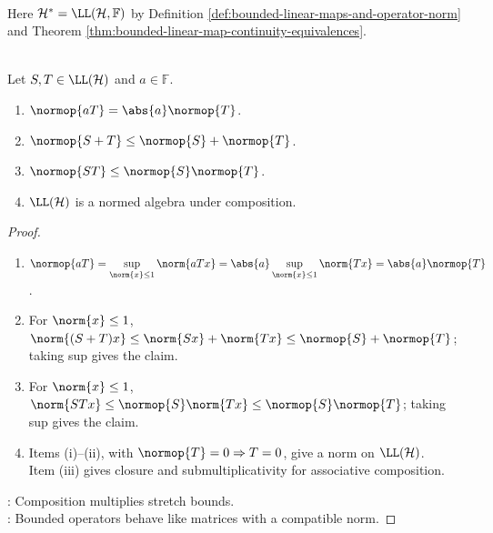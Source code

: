 \begin{perspective} \label{per:bounded-functionals-riesz-transition} \\
Here $\mathcal{H}^*=\LL(\mathcal{H},\mathbb{F})$ by Definition \ref{def:bounded-linear-maps-and-operator-norm} and Theorem \ref{thm:bounded-linear-map-continuity-equivalences}.
\end{perspective}

\begin{proposition} \label{prop:bounded-operators-on-hilbert-space-norm-algebra} \\
Let $S,T\in\LL(\mathcal{H})$ and $a\in\mathbb{F}$.
\begin{enumerate}[label=(\roman*)]
\setlength{\itemsep}{0pt}
\item $\normop{aT}=\abs{a}\normop{T}$.
\item $\normop{S+T}\leq\normop{S}+\normop{T}$.
\item $\normop{ST}\leq\normop{S}\normop{T}$.
\item $\LL(\mathcal{H})$ is a normed algebra under composition.
\end{enumerate}
\begin{proof}
\begin{enumerate}[label=(\roman*)]
\setlength{\itemsep}{0pt}
\item $\normop{aT}=\sup\limits_{\norm{x}\leq1}\norm{aTx}=\abs{a}\sup\limits_{\norm{x}\leq1}\norm{Tx}=\abs{a}\normop{T}$.
\item For $\norm{x}\leq1$, $\norm{(S+T)x}\leq\norm{Sx}+\norm{Tx}\leq\normop{S}+\normop{T}$; taking sup gives the claim.
\item For $\norm{x}\leq1$, $\norm{STx}\leq\normop{S}\norm{Tx}\leq\normop{S}\normop{T}$; taking sup gives the claim.
\item Items (i)--(ii), with $\normop{T}=0\Rightarrow T=0$, give a norm on $\LL(\mathcal{H})$.\\
Item (iii) gives closure and submultiplicativity for associative composition.
\end{enumerate}
: Composition multiplies stretch bounds.\\
: Bounded operators behave like matrices with a compatible norm.
\end{proof}
\end{proposition}

